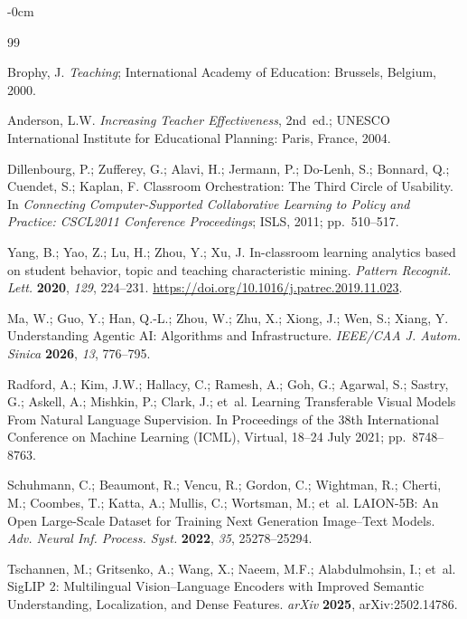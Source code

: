 \documentclass[symmetry,article,submit,pdftex,moreauthors]{Definitions/mdpi}
\begin{document}
\begin{adjustwidth}{-\extralength}{0cm}


\begin{thebibliography}{99}

Brophy, J.
\textit{Teaching}; International Academy of Education: Brussels, Belgium, 2000.

Anderson, L.W.
\textit{Increasing Teacher Effectiveness}, 2nd~ed.; UNESCO International Institute for Educational Planning: Paris, France, 2004.

Dillenbourg, P.; Zufferey, G.; Alavi, H.; Jermann, P.; Do-Lenh, S.; Bonnard, Q.; Cuendet, S.; Kaplan, F.
Classroom Orchestration: The Third Circle of Usability.
In \textit{Connecting Computer-Supported Collaborative Learning to Policy and Practice: CSCL2011 Conference Proceedings}; ISLS, 2011; pp.~510--517.

Yang, B.; Yao, Z.; Lu, H.; Zhou, Y.; Xu, J.
In-classroom learning analytics based on student behavior, topic and teaching characteristic mining.
\textit{Pattern Recognit. Lett.} \textbf{2020}, \textit{129}, 224--231. \url{https://doi.org/10.1016/j.patrec.2019.11.023}.

Ma, W.; Guo, Y.; Han, Q.-L.; Zhou, W.; Zhu, X.; Xiong, J.; Wen, S.; Xiang, Y.
Understanding Agentic AI: Algorithms and Infrastructure.
\textit{IEEE/CAA J. Autom. Sinica} \textbf{2026}, \textit{13}, 776--795.

Radford, A.; Kim, J.W.; Hallacy, C.; Ramesh, A.; Goh, G.; Agarwal, S.; Sastry, G.; Askell, A.; Mishkin, P.; Clark, J.; et~al.
Learning Transferable Visual Models From Natural Language Supervision.
In Proceedings of the 38th International Conference on Machine Learning (ICML), Virtual, 18--24 July 2021; pp.~8748--8763.

Schuhmann, C.; Beaumont, R.; Vencu, R.; Gordon, C.; Wightman, R.; Cherti, M.; Coombes, T.; Katta, A.; Mullis, C.; Wortsman, M.; et~al.
LAION-5B: An Open Large-Scale Dataset for Training Next Generation Image--Text Models.
\textit{Adv. Neural Inf. Process. Syst.} \textbf{2022}, \textit{35}, 25278--25294.

Tschannen, M.; Gritsenko, A.; Wang, X.; Naeem, M.F.; Alabdulmohsin, I.; et~al.
SigLIP 2: Multilingual Vision--Language Encoders with Improved Semantic Understanding, Localization, and Dense Features.
\textit{arXiv} \textbf{2025}, arXiv:2502.14786.


\end{thebibliography}
\end{adjustwidth}
\end{document}
